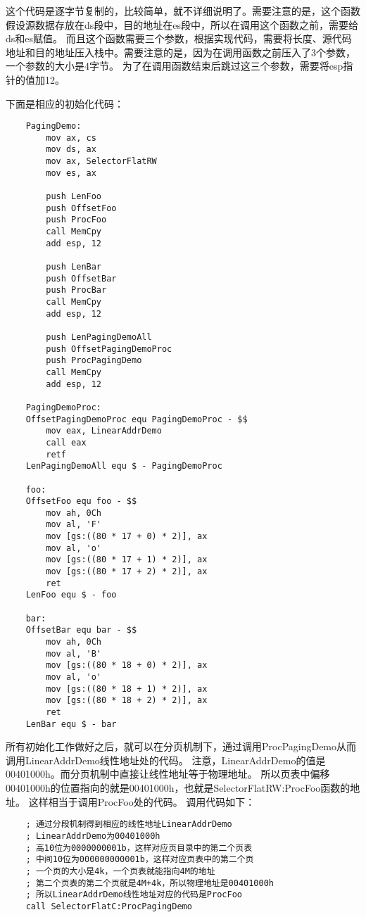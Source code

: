 \documentclass[a4paper,left=2.5cm,right=2.5cm,11pt]{article}
\begin{document}
	这个代码是逐字节复制的，比较简单，就不详细说明了。需要注意的是，这个函数假设源数据存放在ds段中，目的地址在es段中，所以在调用这个函数之前，需要给ds和es赋值。
	而且这个函数需要三个参数，根据实现代码，需要将长度、源代码地址和目的地址压入栈中。需要注意的是，因为在调用函数之前压入了3个参数，一个参数的大小是4字节。
	为了在调用函数结束后跳过这三个参数，需要将esp指针的值加12。\par
	下面是相应的初始化代码：
	\begin{lstlisting}
	PagingDemo:
		mov ax, cs
		mov ds, ax
		mov ax, SelectorFlatRW
		mov es, ax

		push LenFoo
		push OffsetFoo
		push ProcFoo
		call MemCpy
		add esp, 12

		push LenBar
		push OffsetBar
		push ProcBar
		call MemCpy
		add esp, 12

		push LenPagingDemoAll
		push OffsetPagingDemoProc
		push ProcPagingDemo
		call MemCpy
		add esp, 12

	PagingDemoProc:
	OffsetPagingDemoProc equ PagingDemoProc - $$
		mov eax, LinearAddrDemo
		call eax
		retf
	LenPagingDemoAll equ $ - PagingDemoProc

	foo:
	OffsetFoo equ foo - $$
		mov ah, 0Ch
		mov al, 'F'
		mov [gs:((80 * 17 + 0) * 2)], ax
		mov al, 'o'
		mov [gs:((80 * 17 + 1) * 2)], ax
		mov [gs:((80 * 17 + 2) * 2)], ax
		ret
	LenFoo equ $ - foo
	
	bar:
	OffsetBar equ bar - $$
		mov ah, 0Ch
		mov al, 'B'
		mov [gs:((80 * 18 + 0) * 2)], ax
		mov al, 'o'
		mov [gs:((80 * 18 + 1) * 2)], ax
		mov [gs:((80 * 18 + 2) * 2)], ax
		ret
	LenBar equ $ - bar
	\end{lstlisting}

	所有初始化工作做好之后，就可以在分页机制下，通过调用ProcPagingDemo从而调用LinearAddrDemo线性地址处的代码。
	注意，LinearAddrDemo的值是00401000h。而分页机制中直接让线性地址等于物理地址。
	所以页表中偏移00401000h的位置指向的就是00401000h，也就是SelectorFlatRW:ProcFoo函数的地址。
	这样相当于调用ProcFoo处的代码。
	调用代码如下：
	\begin{lstlisting}
	; 通过分段机制得到相应的线性地址LinearAddrDemo
	; LinearAddrDemo为00401000h
	; 高10位为0000000001b，这样对应页目录中的第二个页表
	; 中间10位为000000000001b，这样对应页表中的第二个页
	; 一个页的大小是4k，一个页表就能指向4M的地址
	; 第二个页表的第二个页就是4M+4k，所以物理地址是00401000h
	; 所以LinearAddrDemo线性地址对应的代码是ProcFoo
	call SelectorFlatC:ProcPagingDemo
	\end{lstlisting}
\end{document}
